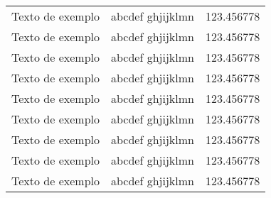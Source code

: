 {\begin{longtable}{l|r|c}
  Texto de exemplo & abcdef ghjijklmn & 123.456778 \\
  Texto de exemplo & abcdef ghjijklmn & 123.456778 \\
  Texto de exemplo & abcdef ghjijklmn & 123.456778 \\
  Texto de exemplo & abcdef ghjijklmn & 123.456778 \\
  Texto de exemplo & abcdef ghjijklmn & 123.456778 \\
  Texto de exemplo & abcdef ghjijklmn & 123.456778 \\
  Texto de exemplo & abcdef ghjijklmn & 123.456778 \\
  Texto de exemplo & abcdef ghjijklmn & 123.456778 \\
  Texto de exemplo & abcdef ghjijklmn & 123.456778 \\

\end{longtable}
} %
